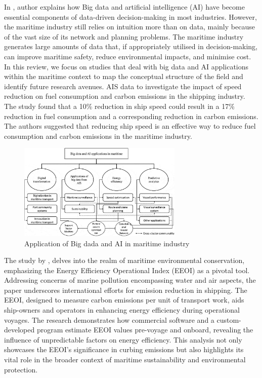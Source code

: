In  \autocite{doi:10.1080/03088839.2020.1788731}, author \citeauthor{doi:10.1080/03088839.2020.1788731} explains how Big data and artificial intelligence (AI) have become essential components of data-driven decision-making in most industries.
However, the maritime industry still relies on intuition more than on data, mainly because of the vast size of its network and planning problems.
The maritime industry generates large amounts of data that, if appropriately utilised in decision-making, can improve maritime safety, reduce environmental impacts, and minimise cost. In this review, we focus on studies that deal with big data and AI applications within the maritime context to map the conceptual structure of the field and identify future research avenues.
AIS data to investigate the impact of speed reduction on fuel consumption and carbon emissions in the shipping industry.
The study found that a 10\% reduction in ship speed could result in a 17\% reduction in fuel consumption and a corresponding reduction in carbon emissions.
The authors suggested that reducing ship speed is an effective way to reduce fuel consumption and carbon emissions in the maritime industry.

\begin{figure}[h]
    \centering
    \includegraphics[width=0.7\textwidth]{images/application_big_data_martime.jpeg}
    \caption{Application of Big dada and AI in maritime industry}
    \label{applicationBigDataMartime}
\end{figure}

The study by \citeauthor{acomi2014improving} \autocite{acomi2014improving}, delves into the realm of maritime environmental conservation, emphasizing the Energy Efficiency Operational Index (EEOI) as a pivotal tool.
Addressing concerns of marine pollution encompassing water and air aspects, the paper underscores international efforts for emission reduction in shipping.
The EEOI, designed to measure carbon emissions per unit of transport work, aids ship-owners and operators in enhancing energy efficiency during operational voyages.
The research demonstrates how commercial software and a custom-developed program estimate EEOI values pre-voyage and onboard, revealing the influence of unpredictable factors on energy efficiency.
This analysis not only showcases the EEOI's significance in curbing emissions but also highlights its vital role in the broader context of maritime sustainability and environmental protection.

